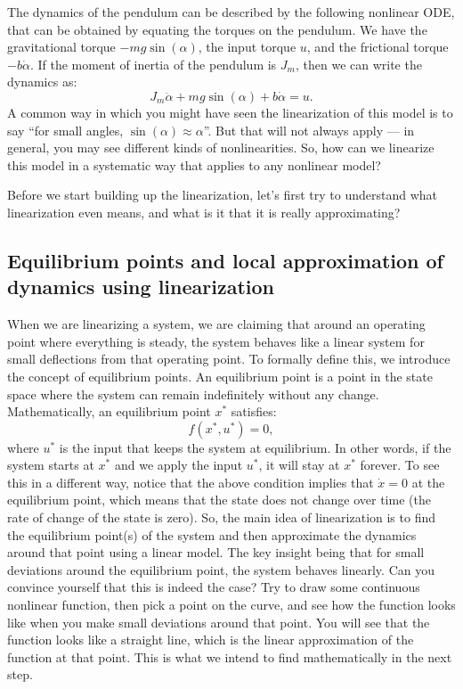 \documentclass{ee122_notes}
\begin{document}
The dynamics of the pendulum can be described by the following nonlinear ODE, that can be obtained by equating the torques on the pendulum. We have the gravitational torque $-mg\sin(\alpha)$, the input torque $u$, and the frictional torque $-b\dot \alpha$. If the moment of inertia of the pendulum is $J_m$, then we can write the dynamics as:
\[
J_m \ddot \alpha + mg\sin(\alpha) + b\dot \alpha = u.
\]
A common way in which you might have seen the linearization of this model is to say ``for small angles, $\sin(\alpha) \approx \alpha$''. But that will not always apply --- in general, you may see different kinds of nonlinearities. So, how can we linearize this model in a systematic way that applies to any nonlinear model? 

Before we start building up the linearization, let's first try to understand what linearization even means, and what is it that it is really approximating?

\subsection{Equilibrium points and local approximation of dynamics using linearization}
When we are linearizing a system, we are claiming that around an operating point where everything is steady, the system behaves like a linear system for small deflections from that operating point. To formally define this, we introduce the concept of equilibrium points. An equilibrium point is a point in the state space where the system can remain indefinitely without any change. Mathematically, an equilibrium point $x^*$ satisfies:
\[
f(x^*, u^*) = 0,
\]
where $u^*$ is the input that keeps the system at equilibrium. In other words, if the system starts at $x^*$ and we apply the input $u^*$, it will stay at $x^*$ forever. To see this in a different way, notice that the above condition implies that $\dot x = 0$ at the equilibrium point, which means that the state does not change over time (the rate of change of the state is zero). So, the main idea of linearization is to find the equilibrium point(s) of the system and then approximate the dynamics around that point using a linear model. The key insight being that for small deviations around the equilibrium point, the system behaves linearly. Can you convince yourself that this is indeed the case? Try to draw some continuous nonlinear function, then pick a point on the curve, and see how the function looks like when you make small deviations around that point. You will see that the function looks like a straight line, which is the linear approximation of the function at that point. This is what we intend to find mathematically in the next step.
\end{document}
